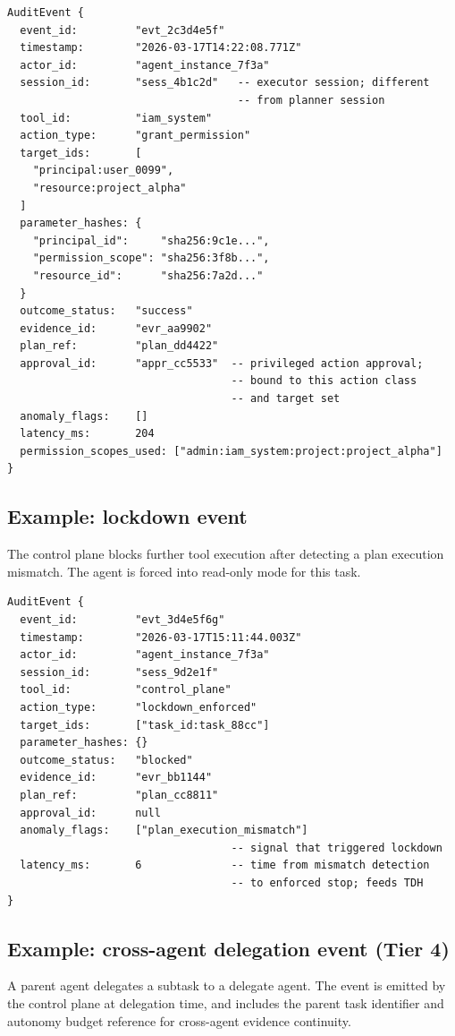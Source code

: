 \documentclass[11pt]{article}
\begin{document}
\begin{verbatim}
AuditEvent {
  event_id:         "evt_2c3d4e5f"
  timestamp:        "2026-03-17T14:22:08.771Z"
  actor_id:         "agent_instance_7f3a"
  session_id:       "sess_4b1c2d"   -- executor session; different
                                    -- from planner session
  tool_id:          "iam_system"
  action_type:      "grant_permission"
  target_ids:       [
    "principal:user_0099",
    "resource:project_alpha"
  ]
  parameter_hashes: {
    "principal_id":     "sha256:9c1e...",
    "permission_scope": "sha256:3f8b...",
    "resource_id":      "sha256:7a2d..."
  }
  outcome_status:   "success"
  evidence_id:      "evr_aa9902"
  plan_ref:         "plan_dd4422"
  approval_id:      "appr_cc5533"  -- privileged action approval;
                                   -- bound to this action class
                                   -- and target set
  anomaly_flags:    []
  latency_ms:       204
  permission_scopes_used: ["admin:iam_system:project:project_alpha"]
}
\end{verbatim}

\subsection{Example: lockdown event}
The control plane blocks further tool execution after detecting a plan execution mismatch. The agent is forced into read-only mode for this task.

\begin{verbatim}
AuditEvent {
  event_id:         "evt_3d4e5f6g"
  timestamp:        "2026-03-17T15:11:44.003Z"
  actor_id:         "agent_instance_7f3a"
  session_id:       "sess_9d2e1f"
  tool_id:          "control_plane"
  action_type:      "lockdown_enforced"
  target_ids:       ["task_id:task_88cc"]
  parameter_hashes: {}
  outcome_status:   "blocked"
  evidence_id:      "evr_bb1144"
  plan_ref:         "plan_cc8811"
  approval_id:      null
  anomaly_flags:    ["plan_execution_mismatch"]
                                   -- signal that triggered lockdown
  latency_ms:       6              -- time from mismatch detection
                                   -- to enforced stop; feeds TDH
}
\end{verbatim}

\subsection{Example: cross-agent delegation event (Tier 4)}
A parent agent delegates a subtask to a delegate agent. The event is emitted by the control plane at delegation time, and includes the parent task identifier and autonomy budget reference for cross-agent evidence continuity.
\end{document}
